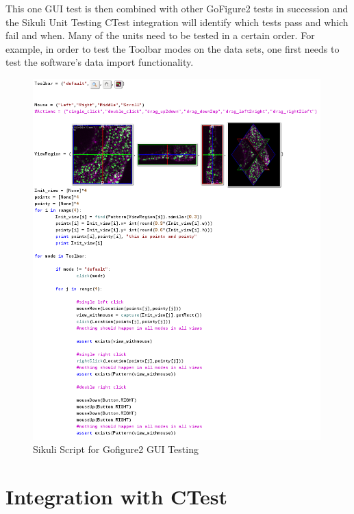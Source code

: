 \documentclass{InsightArticle}
\begin{document}
This one GUI test is then combined with other GoFigure2 tests in succession and
the Sikuli Unit Testing CTest integration will identify which tests pass and
which fail and when. Many of the units need to be tested in a certain order.
For example, in order to test the Toolbar modes on the data sets, one first
needs to test the software's data import functionality.

\begin{figure}[htp]
 \centering
 \includegraphics[width=0.99\textwidth]{Images/Gofigure2Example.png}
 \caption{Sikuli Script for Gofigure2 GUI Testing}
 \label{fig:Gofigure2Example}
\end{figure}

\section{Integration with CTest}
\end{document}
